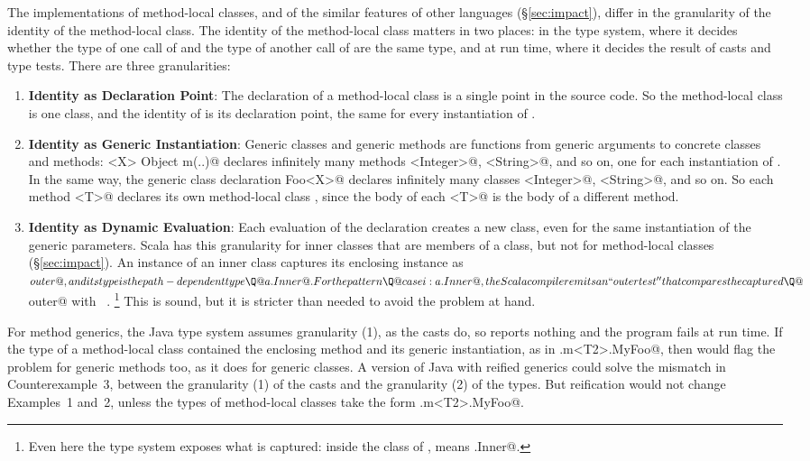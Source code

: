 The implementations of method-local classes, and of the similar features of other languages (\S\ref{sec:impact}), differ in the granularity of the identity of the method-local class.
The identity of the method-local class matters in two places:
in the type system, where it decides whether the type \Q@MyFoo@ of one call of \Q@m@ and the type \Q@MyFoo@ of another call of \Q@m@ are the same type,
and at run time, where it decides the result of casts and type tests.
There are three granularities:
\begin{enumerate}
\item \textbf{Identity as Declaration Point}: The declaration of a method-local class is a single point in the source code.
So the method-local class \Q@MyFoo@ is one class, and the identity of \Q@MyFoo@ is its declaration point, the same for every instantiation of \Q@m@.
\item \textbf{Identity as Generic Instantiation}:
Generic classes and generic methods are functions from generic arguments to concrete classes and methods:
\Q@static <X> Object m(..)@ declares infinitely many methods \Q@m<Integer>@, \Q@m<String>@, and so on, one for each instantiation of \Q@X@.
In the same way, the generic class declaration \Q@class Foo<X>@ declares infinitely many classes \Q@Foo<Integer>@, \Q@Foo<String>@, and so on.
So each method \Q@m<T>@ declares its own method-local class \Q@MyFoo@, since the body of each \Q@m<T>@ is the body of a different method.
\item \textbf{Identity as Dynamic Evaluation}: 
Each evaluation of the declaration creates a new class, even for the same instantiation of the generic parameters.
Scala has this granularity for inner classes that are members of a class, but not for method-local classes (\S\ref{sec:impact}).
An instance of an inner class \Q@Inner@ captures its enclosing instance \Q@a@ as \Q@$outer@, and its type is the path-dependent type \Q@a.Inner@.
For the pattern \Q@case i: a.Inner@, the Scala compiler emits an ``outer test'' that compares the captured \Q@$outer@ with \Q@a@~\cite[Section~8.2]{scala_spec}.%
\footnote{Even here the type system exposes what is captured: inside the class of \Q@a@, \Q@Inner@ means \Q@this.Inner@.}
This is sound, but it is stricter than needed to avoid the problem at hand.
\end{enumerate}

For method generics, the Java type system assumes granularity (1), as the casts do, so \javac reports nothing and the program fails at run time.
If the type of a method-local class contained the enclosing method and its generic instantiation, as in .m<T2>.MyFoo@,
then \javac would flag the problem for generic methods too, as it does for generic classes.
A version of Java with reified generics could solve the mismatch in Counterexample~3, between the granularity (1) of the casts and the granularity (2) of the types.
But reification would not change Examples~1 and~2, unless the types of method-local classes take the form .m<T2>.MyFoo@.

